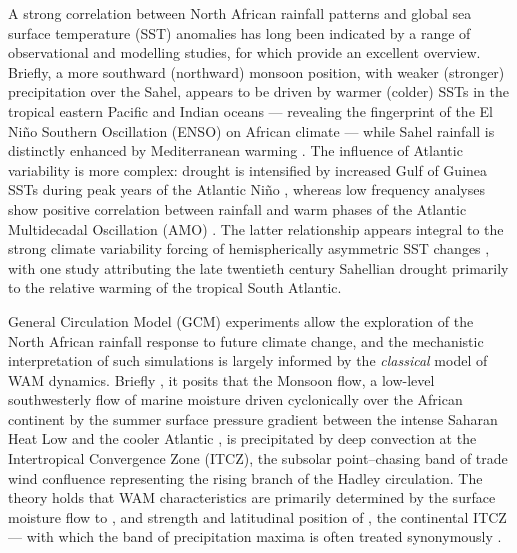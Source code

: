 \documentclass[a4paper]{article}
\begin{document}
A strong correlation between North African rainfall patterns and global sea surface temperature (SST) anomalies has long been indicated by a range of observational and modelling studies, for which \citeauthor{rodriguez2015variability} \parencite{rodriguez2015variability} provide an excellent overview.
Briefly, a more southward (northward) monsoon position, with weaker (stronger) precipitation over the Sahel, appears to be driven by warmer (colder) SSTs in the tropical eastern Pacific \parencite{rowell1995variability, fontaine1996sea, rowell2001teleconnections, janicot2001summer, giannini2003oceanic} and Indian \parencite{rowell1995variability, fontaine1996sea, bader2003impact, giannini2003oceanic} oceans --- revealing the fingerprint of the El Ni\~{n}o Southern Oscillation (ENSO) on African climate \parencite{janowiak1988investigation, rowell1995variability, ward1998diagnosis} --- while Sahel rainfall is distinctly enhanced by Mediterranean warming \parencite{rowell2003impact, gaetani2010influence, fontaine2010impacts}.
The influence of Atlantic variability is more complex: drought is intensified by increased Gulf of Guinea SSTs during peak years of the Atlantic Ni\~{n}o \parencite{lamb1978case, bah1987towards, rowell1995variability, fontaine1996sea, ward1998diagnosis, giannini2003oceanic}, whereas low frequency analyses show positive correlation between rainfall and warm phases of the Atlantic Multidecadal Oscillation (AMO) \parencite{zhang2006impact, martin2014impact}.
The latter relationship appears integral to the strong climate variability forcing of hemispherically asymmetric SST changes \parencite{folland1986sahel, lamb1978large, rowell1995variability, fontaine1998evolution, ward1998diagnosis}, with one study \parencite{hoerling2006detection} attributing the late twentieth century Sahellian drought primarily to the relative warming of the tropical South Atlantic. 

General Circulation Model (GCM) experiments allow the exploration of the North African rainfall response to future climate change, and the mechanistic interpretation of such simulations is largely informed by the \emph{classical} model of WAM dynamics.
Briefly \parencite[see][for comprehensive descriptions]{sultan2000abrupt, sultan2003west2, ramel2006northward}, it posits that the Monsoon flow, a low-level southwesterly flow of marine moisture driven cyclonically over the African continent by the summer surface pressure gradient between the intense Saharan Heat Low and the cooler Atlantic \parencite{hall2006dynamics, grams2010atlantic}, is precipitated by deep convection at the Intertropical Convergence Zone (ITCZ), the subsolar point--chasing band of trade wind confluence representing the rising branch of the Hadley circulation.
The theory holds that WAM characteristics are primarily determined by the surface moisture flow to \parencite{folland1986sahel, sultan2003west1, hagos2007dynamics}, and strength and latitudinal position of \parencite{janicot1998west, damato1998characteristics, sultan2003west1}, the continental ITCZ --- with which the band of precipitation maxima is often treated synonymously \parencite[e.g.][]{shinoda1994tropical, ba1995satellite, ramel2006northward, braconnot2007results, peyrille2016annual}.
\end{document}
